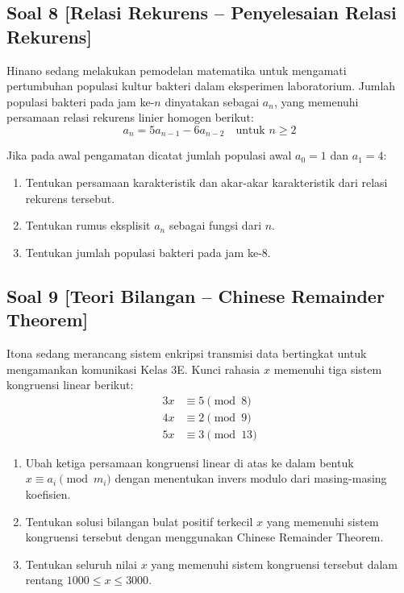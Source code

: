 \documentclass[12pt,a4paper]{article}
\begin{document}
\subsection*{Soal 8 [Relasi Rekurens -- Penyelesaian Relasi Rekurens]}
Hinano sedang melakukan pemodelan matematika untuk mengamati pertumbuhan populasi kultur bakteri dalam eksperimen laboratorium. Jumlah populasi bakteri pada jam ke-$n$ dinyatakan sebagai $a_n$, yang memenuhi persamaan relasi rekurens linier homogen berikut:
\[ a_n = 5a_{n-1} - 6a_{n-2} \quad \text{untuk } n \geq 2 \]

Jika pada awal pengamatan dicatat jumlah populasi awal $a_0 = 1$ dan $a_1 = 4$:
\begin{enumerate}[label=(\alph*)]
    \item Tentukan persamaan karakteristik dan akar-akar karakteristik dari relasi rekurens tersebut.
    \item Tentukan rumus eksplisit $a_n$ sebagai fungsi dari $n$.
    \item Tentukan jumlah populasi bakteri pada jam ke-8.
\end{enumerate}

\subsection*{Soal 9 [Teori Bilangan -- Chinese Remainder Theorem]}
Itona sedang merancang sistem enkripsi transmisi data bertingkat untuk mengamankan komunikasi Kelas 3E. Kunci rahasia $x$ memenuhi tiga sistem kongruensi linear berikut:
\begin{align*}
    3x &\equiv 5 \pmod 8 \\
    4x &\equiv 2 \pmod 9 \\
    5x &\equiv 3 \pmod{13}
\end{align*}

\begin{enumerate}[label=(\alph*)]
    \item Ubah ketiga persamaan kongruensi linear di atas ke dalam bentuk $x \equiv a_i \pmod{m_i}$ dengan menentukan invers modulo dari masing-masing koefisien.
    \item Tentukan solusi bilangan bulat positif terkecil $x$ yang memenuhi sistem kongruensi tersebut dengan menggunakan Chinese Remainder Theorem.
    \item Tentukan seluruh nilai $x$ yang memenuhi sistem kongruensi tersebut dalam rentang $1000 \leq x \leq 3000$.
\end{enumerate}
\end{document}
